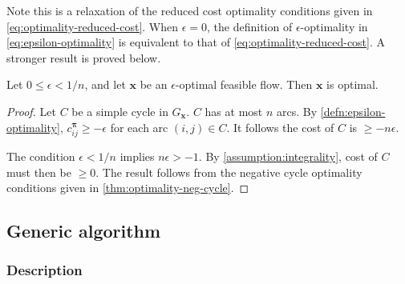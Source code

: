 \begin{remark}
Note this is a relaxation of the reduced cost optimality conditions given in \cref{eq:optimality-reduced-cost}. When $\epsilon = 0$, the definition of $\epsilon$-optimality in \cref{eq:epsilon-optimality} is equivalent to that of \cref{eq:optimality-reduced-cost}. A stronger result is proved below.\\
\end{remark}

\begin{thm} \label{thm:epsilon-optimality-optimal}
Let $0 \leq \epsilon < 1/n$, and let $\mathbf{x}$ be an $\epsilon$-optimal feasible flow. Then $\mathbf{x}$ is optimal.
\end{thm}
\begin{proof}
Let $C$ be a simple cycle in $G_\mathbf{x}$. $C$ has at most $n$ arcs. By \cref{defn:epsilon-optimality}, $c^{\boldsymbol{\pi}}_{ij} \geq -\epsilon$ for each arc $(i,j) \in C$. It follows the cost of $C$ is $\geq -n\epsilon$.

The condition $\epsilon < 1/n$ implies $n\epsilon > -1$. By \cref{assumption:integrality}, cost of $C$ must then be $\geq 0$. The result follows from the negative cycle optimality conditions given in \cref{thm:optimality-neg-cycle}.
\end{proof}

\subsection{Generic algorithm}


\subsubsection{Description}



